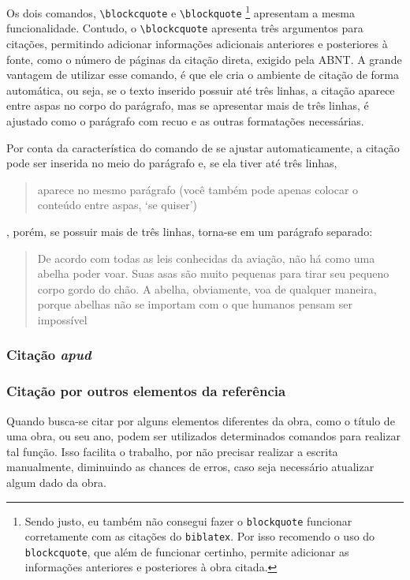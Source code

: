 Os dois comandos, \verb|\blockcquote| e \verb|\blockquote|%
\footnote{Sendo justo, eu também não consegui fazer o \texttt{blockquote} funcionar corretamente com as citações do \texttt{biblatex}. Por isso recomendo o uso do \texttt{blockcquote}, que além de funcionar certinho, permite adicionar as informações anteriores e posteriores à obra citada.} 
apresentam a mesma funcionalidade. Contudo, o \verb|\blockcquote| apresenta três argumentos para citações, permitindo adicionar informações adicionais anteriores e posteriores à fonte, como o número de páginas da citação direta, exigido pela ABNT. A grande vantagem de utilizar esse comando, é que ele cria o ambiente de citação de forma automática, ou seja, se o texto inserido possuir até três linhas, a citação aparece entre aspas no corpo do parágrafo, mas se apresentar mais de três linhas, é ajustado como o parágrafo com recuo e as outras formatações necessárias.

Por conta da característica do comando de se ajustar automaticamente, a citação pode ser inserida no meio do parágrafo e, se ela tiver até três linhas, \blockcquote{batman}{aparece no mesmo parágrafo (você também pode apenas colocar o conteúdo entre aspas, `se quiser')}, porém, se possuir mais de três linhas, torna-se em um parágrafo separado:
\blockcquote[tradução nossa]{filme:bee-movie-2007}{De acordo com todas as leis conhecidas da aviação, não há como uma abelha poder voar. Suas asas são muito pequenas para tirar seu pequeno corpo gordo do chão. A abelha, obviamente, voa de qualquer maneira, porque abelhas não se importam com o que humanos pensam ser impossível}

\subsubsection{Citação \textit{apud}}

\subsubsection{Citação por outros elementos da referência}
Quando busca-se citar por alguns elementos diferentes da obra, como o título de uma obra, ou seu ano, podem ser utilizados determinados comandos para realizar tal função\footnotemark. Isso facilita o trabalho, por não precisar realizar a escrita manualmente, diminuindo as chances de erros, caso seja necessário atualizar algum dado da obra.

